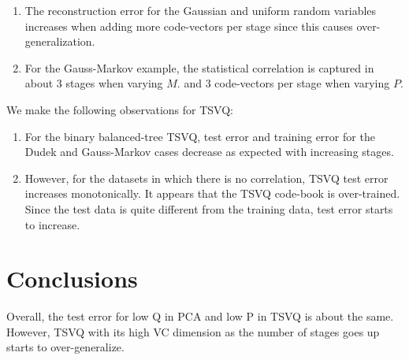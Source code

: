 \begin{enumerate}
\item The reconstruction error for the Gaussian and uniform random variables increases when adding more code-vectors per stage since this causes over-generalization.
\item For the Gauss-Markov example, the statistical correlation is captured in about 3 stages when varying $M$. and 3 code-vectors per stage when varying $P$.
\end{enumerate}

%

We make the following observations for TSVQ:
\begin{enumerate}
\item For the binary balanced-tree TSVQ, test error and training error for the Dudek and Gauss-Markov cases decrease as expected with increasing stages.  

\item However, for the datasets in which there is no correlation, TSVQ test error increases monotonically.  It appears that the TSVQ code-book is over-trained.  Since the test data is quite different from the training data, test error starts to increase.  
\end{enumerate}

\section{Conclusions}
Overall, the test error for low Q in PCA and low P in TSVQ is about the same.  However, TSVQ with its high VC dimension as the number of stages goes up starts to over-generalize.

